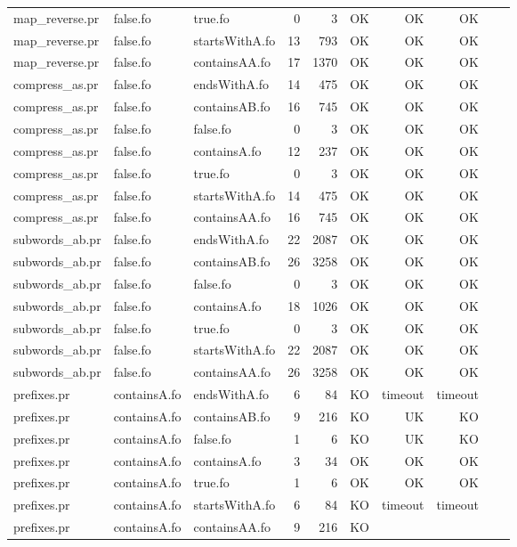\begin{tabular}{l|l|l|r|r|r|r|r|r|r}
map\_reverse.pr & false.fo & true.fo & 0 & 3 & OK & 
OK & OK \\
map\_reverse.pr & false.fo & startsWithA.fo & 13 & 793 & OK & 
OK & OK \\
map\_reverse.pr & false.fo & containsAA.fo & 17 & 1370 & OK & 
OK & OK \\
compress\_as.pr & false.fo & endsWithA.fo & 14 & 475 & OK & 
OK & OK \\
compress\_as.pr & false.fo & containsAB.fo & 16 & 745 & OK & 
OK & OK \\
compress\_as.pr & false.fo & false.fo & 0 & 3 & OK & 
OK & OK \\
compress\_as.pr & false.fo & containsA.fo & 12 & 237 & OK & 
OK & OK \\
compress\_as.pr & false.fo & true.fo & 0 & 3 & OK & 
OK & OK \\
compress\_as.pr & false.fo & startsWithA.fo & 14 & 475 & OK & 
OK & OK \\
compress\_as.pr & false.fo & containsAA.fo & 16 & 745 & OK & 
OK & OK \\
subwords\_ab.pr & false.fo & endsWithA.fo & 22 & 2087 & OK & 
OK & OK \\
subwords\_ab.pr & false.fo & containsAB.fo & 26 & 3258 & OK & 
OK & OK \\
subwords\_ab.pr & false.fo & false.fo & 0 & 3 & OK & 
OK & OK \\
subwords\_ab.pr & false.fo & containsA.fo & 18 & 1026 & OK & 
OK & OK \\
subwords\_ab.pr & false.fo & true.fo & 0 & 3 & OK & 
OK & OK \\
subwords\_ab.pr & false.fo & startsWithA.fo & 22 & 2087 & OK & 
OK & OK \\
subwords\_ab.pr & false.fo & containsAA.fo & 26 & 3258 & OK & 
OK & OK \\
prefixes.pr & containsA.fo & endsWithA.fo & 6 & 84 & KO & 
timeout & timeout \\
prefixes.pr & containsA.fo & containsAB.fo & 9 & 216 & KO & 
UK & KO \\
prefixes.pr & containsA.fo & false.fo & 1 & 6 & KO & 
UK & KO \\
prefixes.pr & containsA.fo & containsA.fo & 3 & 34 & OK & 
OK & OK \\
prefixes.pr & containsA.fo & true.fo & 1 & 6 & OK & 
OK & OK \\
prefixes.pr & containsA.fo & startsWithA.fo & 6 & 84 & KO & 
timeout & timeout \\
prefixes.pr & containsA.fo & containsAA.fo & 9 & 216 & KO & 

\end{tabular}
